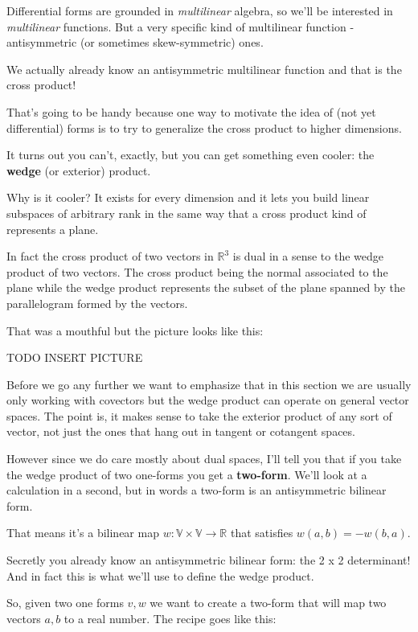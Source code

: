 \documentclass{article}
\begin{document}
Differential forms are grounded in \textit{multilinear} algebra, so we'll be
interested in \textit{multilinear} functions. But a very specific kind of
multilinear function - antisymmetric (or sometimes skew-symmetric) ones.

We actually already know an antisymmetric multilinear function and that is the
cross product!

That's going to be handy because one way to motivate the idea of (not yet
differential) forms is to try to generalize the cross product to higher
dimensions.

It turns out you can't, exactly, but you can get something even cooler: the
\textbf{wedge} (or exterior) product.

Why is it cooler? It exists for every dimension and it lets you build linear
subspaces of arbitrary rank in the same way that a cross product kind of
represents a plane.

In fact the cross product of two vectors in $\mathbb{R}^{3}$
is dual in a sense to the wedge product of two vectors. The cross product being
the normal associated to the plane while the wedge product represents the subset
of the plane spanned by the parallelogram formed by the vectors.

That was a mouthful but the picture looks like this:

TODO INSERT PICTURE

Before we go any further we want to emphasize that in this section we are
usually only working with covectors but the wedge product can operate on general
vector spaces. The point is, it makes sense to take the exterior product of any sort of vector, not just the
ones that hang out in tangent or cotangent spaces.

However since we do care mostly about dual spaces, I'll tell you that if you take
the wedge product of two one-forms you get a \textbf{two-form}. We'll look at a
calculation in a second, but in words a two-form is an antisymmetric bilinear
form.

That means it's a bilinear map $w: \mathbb{V} \times \mathbb{V} \to \mathbb{R}$
that satisfies $w(a, b) = -w(b, a)$.

Secretly you already know an antisymmetric bilinear form: the 2 x 2 determinant!
And in fact this is what we'll use to define the wedge product.

So, given two one forms $v, w$ we want to create a two-form that will map two
vectors $a, b$ to a real number. The recipe goes like this:
\end{document}
